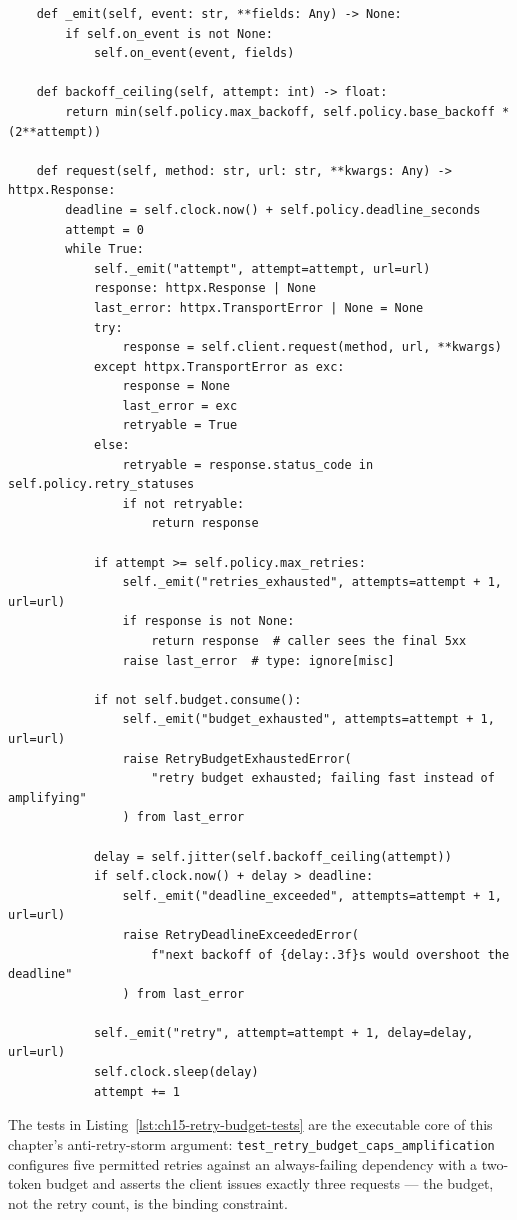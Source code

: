 \begin{verbatim}
    def _emit(self, event: str, **fields: Any) -> None:
        if self.on_event is not None:
            self.on_event(event, fields)

    def backoff_ceiling(self, attempt: int) -> float:
        return min(self.policy.max_backoff, self.policy.base_backoff * (2**attempt))

    def request(self, method: str, url: str, **kwargs: Any) -> httpx.Response:
        deadline = self.clock.now() + self.policy.deadline_seconds
        attempt = 0
        while True:
            self._emit("attempt", attempt=attempt, url=url)
            response: httpx.Response | None
            last_error: httpx.TransportError | None = None
            try:
                response = self.client.request(method, url, **kwargs)
            except httpx.TransportError as exc:
                response = None
                last_error = exc
                retryable = True
            else:
                retryable = response.status_code in self.policy.retry_statuses
                if not retryable:
                    return response

            if attempt >= self.policy.max_retries:
                self._emit("retries_exhausted", attempts=attempt + 1, url=url)
                if response is not None:
                    return response  # caller sees the final 5xx
                raise last_error  # type: ignore[misc]

            if not self.budget.consume():
                self._emit("budget_exhausted", attempts=attempt + 1, url=url)
                raise RetryBudgetExhaustedError(
                    "retry budget exhausted; failing fast instead of amplifying"
                ) from last_error

            delay = self.jitter(self.backoff_ceiling(attempt))
            if self.clock.now() + delay > deadline:
                self._emit("deadline_exceeded", attempts=attempt + 1, url=url)
                raise RetryDeadlineExceededError(
                    f"next backoff of {delay:.3f}s would overshoot the deadline"
                ) from last_error

            self._emit("retry", attempt=attempt + 1, delay=delay, url=url)
            self.clock.sleep(delay)
            attempt += 1
\end{verbatim}

The tests in Listing~\ref{lst:ch15-retry-budget-tests} are the executable
core of this chapter's anti-retry-storm argument:
\texttt{test\_retry\_budget\_caps\_amplification} configures five permitted
retries against an always-failing dependency with a two-token budget and
asserts the client issues exactly three requests --- the budget, not the
retry count, is the binding constraint.

